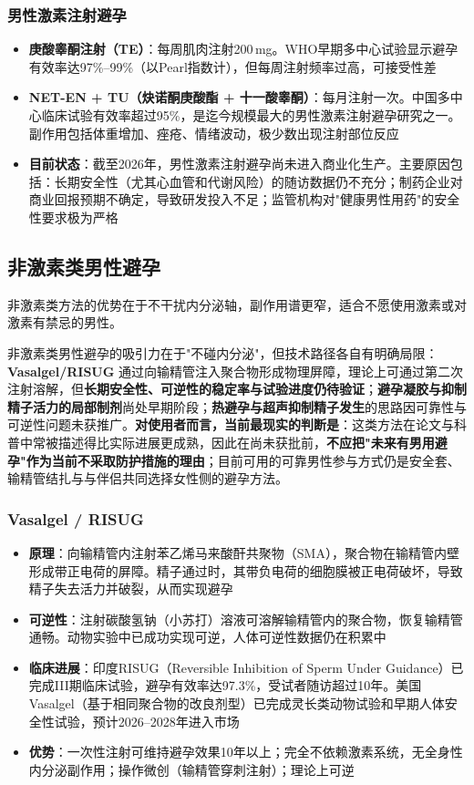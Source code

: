 \documentclass[12pt,a4paper,twoside]{ctexbook}
\begin{document}
\subsubsection{男性激素注射避孕}

\begin{itemize}[leftmargin=2cm]
	\item \textbf{庚酸睾酮注射（TE）}：每周肌肉注射200\,mg。WHO早期多中心试验显示避孕有效率达97\%--99\%（以Pearl指数计），但每周注射频率过高，可接受性差
	\item \textbf{NET-EN + TU（炔诺酮庚酸酯 + 十一酸睾酮）}：每月注射一次。中国多中心临床试验有效率超过95\%，是迄今规模最大的男性激素注射避孕研究之一。副作用包括体重增加、痤疮、情绪波动，极少数出现注射部位反应
	\item \textbf{目前状态}：截至2026年，男性激素注射避孕尚未进入商业化生产。主要原因包括：长期安全性（尤其心血管和代谢风险）的随访数据仍不充分；制药企业对商业回报预期不确定，导致研发投入不足；监管机构对"健康男性用药"的安全性要求极为严格
\end{itemize}

\subsection{非激素类男性避孕}

非激素类方法的优势在于不干扰内分泌轴，副作用谱更窄，适合不愿使用激素或对激素有禁忌的男性。


非激素类男性避孕的吸引力在于"不碰内分泌"，但技术路径各自有明确局限：\textbf{Vasalgel/RISUG} 通过向输精管注入聚合物形成物理屏障，理论上可通过第二次注射溶解，但\textbf{长期安全性、可逆性的稳定率与试验进度仍待验证}；\textbf{避孕凝胶与抑制精子活力的局部制剂}尚处早期阶段；\textbf{热避孕与超声抑制精子发生}的思路因可靠性与可逆性问题未获推广。\textbf{对使用者而言，当前最现实的判断是}：这类方法在论文与科普中常被描述得比实际进展更成熟，因此在尚未获批前，\textbf{不应把"未来有男用避孕"作为当前不采取防护措施的理由}；目前可用的可靠男性参与方式仍是安全套、输精管结扎与与伴侣共同选择女性侧的避孕方法。

\subsubsection{Vasalgel / RISUG}

\begin{itemize}[leftmargin=2cm]
	\item \textbf{原理}：向输精管内注射苯乙烯马来酸酐共聚物（SMA），聚合物在输精管内壁形成带正电荷的屏障。精子通过时，其带负电荷的细胞膜被正电荷破坏，导致精子失去活力并破裂，从而实现避孕
	\item \textbf{可逆性}：注射碳酸氢钠（小苏打）溶液可溶解输精管内的聚合物，恢复输精管通畅。动物实验中已成功实现可逆，人体可逆性数据仍在积累中
	\item \textbf{临床进展}：印度RISUG（Reversible Inhibition of Sperm Under Guidance）已完成III期临床试验，避孕有效率达97.3\%，受试者随访超过10年。美国Vasalgel（基于相同聚合物的改良剂型）已完成灵长类动物试验和早期人体安全性试验，预计2026--2028年进入市场
	\item \textbf{优势}：一次性注射可维持避孕效果10年以上；完全不依赖激素系统，无全身性内分泌副作用；操作微创（输精管穿刺注射）；理论上可逆
\end{itemize}
\end{document}
